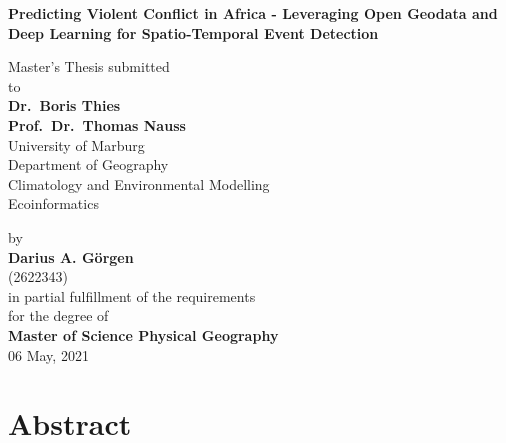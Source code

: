 \documentclass[a4paper,11pt]{article}
\begin{document}
\thispagestyle{empty}
\begin{center}
  {\Large{\bf Predicting Violent Conflict in Africa \linebreak - \linebreak Leveraging Open Geodata and Deep Learning for Spatio-Temporal Event Detection}} \vspace{0.5cm}

  Master's Thesis submitted \\\vspace{0.5cm}
  to \\\vspace{0.5cm}
  \textbf{Dr.~Boris Thies} \\
  \textbf{Prof.~Dr.~Thomas Nauss} \\\vspace{0.5cm}
  University of Marburg \\
  Department of Geography \\
  Climatology and Environmental Modelling \\
   Ecoinformatics \\  \vspace{1cm}

  
  by \\\vspace{0.5cm}
  \textbf{Darius A. Görgen} \\
  (2622343) \\
  
  \medskip
  \medskip
  in partial fulfillment of the requirements \\
  for the degree of \\
  \textbf{Master of Science Physical Geography} \\\vspace{0.5cm}
  06 May, 2021
  
\end{center}
\newpage
\pagestyle{plain}
\setcounter{page}{1}    %
\hypertarget{abstract}{%
\section*{Abstract}\label{abstract}}
\end{document}
